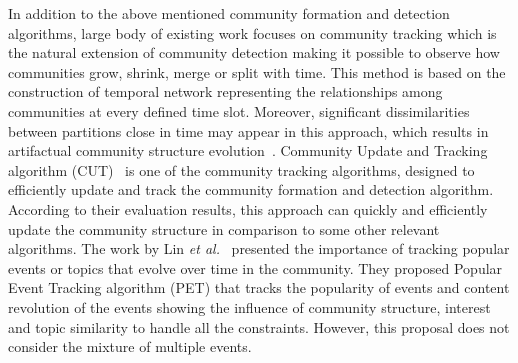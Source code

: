 In addition to the above mentioned community formation and detection algorithms, large body of existing work focuses on community tracking which is the natural extension of community detection making it possible to observe how communities grow, shrink, merge or split with time. This method is based on the construction of temporal network representing the relationships among communities at every defined time slot. Moreover, significant dissimilarities between partitions close in time may appear in this approach, which results in artifactual community structure evolution~\cite{BMitra2012}. Community Update and Tracking algorithm (CUT)~\cite{HSMa2013} is one of the community tracking algorithms, designed to efficiently update and track the community formation and detection algorithm. According to their evaluation results, this approach can quickly and efficiently update the community structure in comparison to some other relevant algorithms. The work by Lin {\it et al.}~\cite{CXLin2010} presented the importance of tracking popular events or topics that evolve over time in the community. They proposed Popular Event Tracking algorithm (PET) that tracks the popularity of events and content revolution of the events showing the influence of community structure, interest and topic similarity to handle all the constraints. However, this proposal does not consider the mixture of multiple events.

